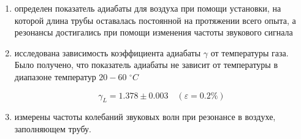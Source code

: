 \documentclass{article}
\begin{document}
\begin{enumerate}

\item определен показатель адиабаты для воздуха при помощи установки, на которой длина трубы оставалась постоянной на протяжении всего опыта, а резонансы достигались при помощи изменения частоты звукового сигнала

\item исследована зависимость коэффициента адиабаты $ \gamma $ от температуры газа. Было получено, что показатель адиабаты не зависит от температуры в диапазоне температур $ 20-60 $ $ ^\circ C $

\[ \boxed{\gamma_L = 1.378 \pm 0.003}\quad (\varepsilon=0.2\%) \]

\item измерены частоты колебаний звуковых волн при резонансе в воздухе, заполняющем трубу.
\end{enumerate}
\end{document}
